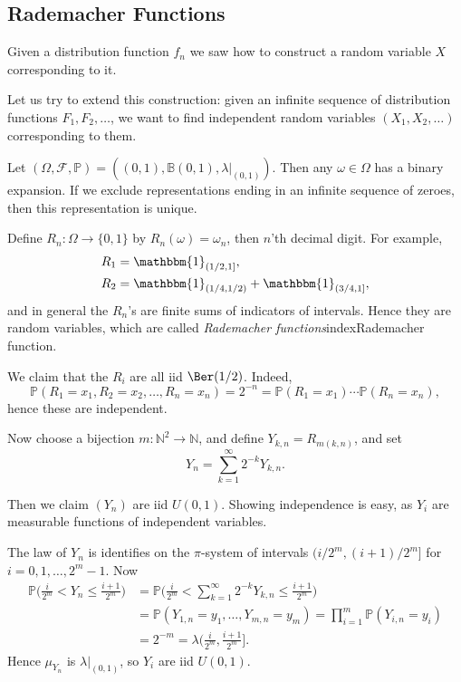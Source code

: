 \documentclass[12pt]{article}
\begin{document}
\subsection{Rademacher Functions}
\label{sub:rad_funs}

Given a distribution function $f_n$ we saw how to construct a random variable $X$ corresponding to it.

Let us try to extend this construction: given an infinite sequence of distribution functions $F_1, F_2, \ldots$, we want to find independent random variables $(X_1, X_2, \ldots)$ corresponding to them.

Let $(\Omega, \mathcal{F}, \mathbb{P}) = ((0, 1), \mathbb{B}(0,1), \lambda|_{(0,1)})$. Then any $\omega \in \Omega$ has a binary expansion. If we exclude representations ending in an infinite sequence of zeroes, then this representation is unique.

Define $R_n : \Omega \to \{0,1\}$ by $R_n(\omega) = \omega_n$, then $n$'th decimal digit. For example,
\begin{align*}
	R_1 &= \mathbbm{1}_{(1/2, 1]}, \\
	R_2 &= \mathbbm{1}_{(1/4,1/2)} + \mathbbm{1}_{(3/4,1]},
\end{align*}
and in general the $R_n$'s are finite sums of indicators of intervals. Hence they are random variables, which are called \emph{Rademacher functions}index{Rademacher function}.

We claim that the $R_i$ are all iid $\Ber(1/2)$. Indeed,
\[
\mathbb{P}(R_1 = x_1, R_2 = x_2, \ldots, R_n = x_n) = 2^{-n} = \mathbb{P}(R_1 = x_1) \cdots \mathbb{P}(R_n = x_n),
\]
hence these are independent.

Now choose a bijection $m : \mathbb{N}^2 \to \mathbb{N}$, and define $Y_{k,n} = R_{m(k,n)}$, and set
\[
Y_n = \sum_{k = 1}^{\infty} 2^{-k} Y_{k,n}.
\]

Then we claim $(Y_n)$ are iid $U(0,1)$. Showing independence is easy, as $Y_i$ are measurable functions of independent variables.

The law of $Y_n$ is identifies on the $\pi$-system of intervals $(i/2^{m}, (i+1)/2^{m}]$ for $i = 0, 1, \ldots, 2^{m}-1$. Now
\begin{align*}
	\mathbb{P}\biggl( \frac{i}{2^{m}} < Y_n \leq \frac{i+1}{2^{m}} \biggr) &= \mathbb{P} \biggl( \frac{i}{2^{m}} < \sum_{k = 1}^{\infty} 2^{-k} Y_{k,n} \leq \frac{i+1}{2^{m}} \biggr) \\
									       &= \mathbb{P}(Y_{1,n} = y_1, \ldots, Y_{m,n} = y_m) = \prod_{i = 1}^{m} \mathbb{P}(Y_{i,n} = y_i) \\
									       &= 2^{-m} = \lambda \biggl( \frac{i}{2^{m}}, \frac{i+1}{2^{m}} \biggr].
\end{align*}
Hence $\mu_{Y_n}$ is $\lambda|_{(0,1)}$, so $Y_i$ are iid $U(0,1)$.
\end{document}

